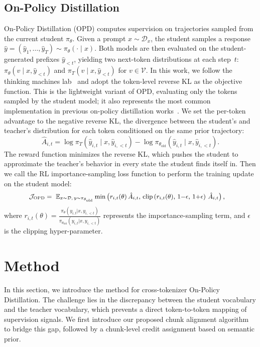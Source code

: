 \documentclass{article}
\theoremstyle{plain}
\theoremstyle{definition}
\theoremstyle{remark}
\begin{document}
\subsection{On-Policy Distillation}
On-Policy Distillation (OPD) computes supervision on trajectories
sampled from the current student $\pi_\theta$. Given a prompt
$x \sim \mathcal{D}_x$, the student samples a response
$\hat{y} = (\hat{y}_1, \ldots, \hat{y}_{T})
  \sim \pi_\theta(\cdot \mid x)$.
Both models are then evaluated on the student-generated prefixes
$\hat{y}_{<t}$, yielding two next-token distributions at each
step~$t$:
$\pi_\theta(v \mid x, \hat{y}_{<t})$ and
$\pi_T(v \mid x, \hat{y}_{<t})$
for $v \in \mathcal{V}$. In this work, we follow the thinking machines lab~\cite{lu2025onpolicydistillation} and adopt the token-level reverse KL as the objective function. This is the lightweight variant of OPD, evaluating only the tokens sampled by the student model; it also represents the most common implementation in previous on-policy distillation works~\cite{lu2025onpolicydistillation,coreteam2026mimov2flashtechnicalreport,yang2025qwen3technicalreport}. We set the per-token advantage to the negative reverse KL, the divergence between the student’s and teacher’s distribution for each token conditioned on the same prior trajectory:
\begin{equation}
\hat{A}_{i,t} = \log \pi_T(\hat{y}_{i,t} \mid x, \hat{y}_{i,<t}) - \log \pi_{\theta_{\mathrm{old}}}(\hat{y}_{i,t} \mid x, \hat{y}_{i,<t}).
\end{equation}
The reward function minimizes the reverse KL, which pushes the student to approximate the teacher’s behavior in every state the student finds itself in. Then we call the RL importance-sampling loss function to perform the training update on the student model:
\begin{equation}\label{eq:grpo}
\small
\begin{aligned}
\mathcal{J}_\text{OPD}& =\ 
\mathbb{E}_{x \sim \mathcal{D},\, y \sim \pi_{\theta_{\mathrm{old}}}} 
  \min\left(
    r_{i,t}(\theta)\, \hat{A}_{i,t},\, 
    \mathrm{clip}\left(
      r_{i,t}(\theta),\, 1{-}\epsilon,\, 1{+}\epsilon
    \right)\, \hat{A}_{i,t}
  \right),
\end{aligned}
\end{equation}
where $r_{i,t}(\theta) = \frac{\pi_\theta(y_{i,t}|x, y_{i,<t})}{\pi_{\theta_\mathrm{old}}(y_{i,t}|x, y_{i,<t})}$ represents the importance-sampling term, and $\epsilon$ is the clipping hyper-parameter.


\section{Method}
In this section, we introduce the method for cross-tokenizer On-Policy Distillation. The challenge lies in the discrepancy between the student vocabulary and the teacher vocabulary, which prevents a direct token-to-token mapping of supervision signals. We first introduce our proposed chunk alignment algorithm to bridge this gap, followed by a chunk-level credit assignment based on semantic prior.
\end{document}
